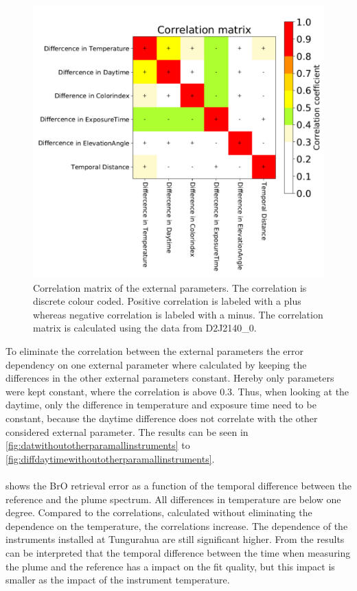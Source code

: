 \documentclass  [
  paper    = a4,
  BCOR     = 10mm,
  twoside,
  fontsize = 12pt,
  fleqn,
  toc      = bibnumbered,
  toc      = listofnumbered,
  numbers  = noendperiod,
  headings = normal,
  listof   = leveldown,
  version  = 3.03
]                                       {scrreprt}
\begin{document}
	\begin{figure}[h]
		\centering
		\includegraphics[width=1\linewidth]{Bilder/varCorrelation_matrix}
		\caption[Correlation matrix of the external parameters using the data from D2J2140\_0.]{Correlation matrix of the external parameters. The correlation is discrete colour coded. Positive correlation is labeled with a plus whereas negative correlation is labeled with a minus. The correlation matrix is calculated using the data from D2J2140\_0.}
		\label{fig:varcorrelationmatrix}
	\end{figure}
%
	To eliminate the correlation between the external parameters the   error dependency on one external parameter where calculated by keeping the differences in the other external parameters constant. Hereby only parameters were kept constant, where the correlation is above 0.3. Thus, when looking at the daytime, only the difference in temperature and exposure time need to be constant, because the daytime  difference does not correlate with the other considered external parameter. The results can be seen in \cref{fig:datwithoutotherparamallinstruments} to \cref{fig:diffdaytimewithoutotherparamallinstruments}.\\
	\\
	 shows the BrO retrieval error as a function of the temporal difference between the reference and the plume spectrum. All differences in temperature are below one degree. Compared to the correlations, calculated without eliminating the dependence on the temperature, the correlations increase. The dependence of the instruments installed at Tungurahua are still significant higher. From the results can be interpreted that the temporal difference between the time when measuring the plume and the reference has a impact on the fit quality, but this impact is smaller as the impact of the instrument temperature.\\
\end{document}
